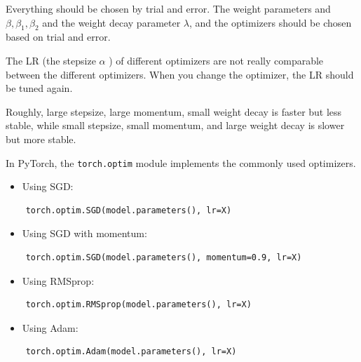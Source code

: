 \documentclass{report}
\begin{document}
\begin{concept}
    Everything should be chosen by trial and error. The weight parameters and $\beta, \beta_{1}, \beta_{2}$ and the weight decay parameter $\lambda$, and the optimizers should be chosen based on trial and error.

    The LR (the stepsize $\alpha$ ) of different optimizers are not really comparable between the different optimizers. When you change the optimizer, the LR should be tuned again.

    Roughly, large stepsize, large momentum, small weight decay is faster but less stable, while small stepsize, small momentum, and large weight decay is slower but more stable.
\end{concept}

\begin{concept}
    In PyTorch, the \verb|torch.optim| module implements the commonly used optimizers.

    \begin{itemize}
        \item Using SGD:
    \end{itemize}

    \begin{verbatim}
    torch.optim.SGD(model.parameters(), lr=X)
    \end{verbatim}

    \begin{itemize}
        \item Using SGD with momentum:
    \end{itemize}

    \begin{verbatim}
    torch.optim.SGD(model.parameters(), momentum=0.9, lr=X)
    \end{verbatim}

    \begin{itemize}
        \item Using RMSprop:
    \end{itemize}

    \begin{verbatim}
    torch.optim.RMSprop(model.parameters(), lr=X)
    \end{verbatim}

    \begin{itemize}
        \item Using Adam:
    \end{itemize}

    \begin{verbatim}
    torch.optim.Adam(model.parameters(), lr=X)
    \end{verbatim}
\end{concept}
\end{document}
